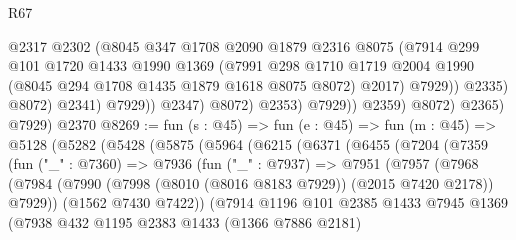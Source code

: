 \begin{lexlean}{R67}
\begin{coremodule}
                                @2317
                                @2302
                                (@8045
                                  @347
                                  @1708
                                  @2090
                                  @1879
                                  @2316
                                  @8075
                                  (@7914
                                    @299
                                    @101
                                    @1720
                                    @1433
                                    @1990
                                    @1369
                                    (@7991
                                      @298
                                      @1710
                                      @1719
                                      @2004
                                      @1990
                                      (@8045 @294 @1708 @1435 @1879 @1618 @8075 @8072)
                                      @2017)
                                    @7929))
                                @2335)
                              @8072)
                            @2341)
                          @7929))
                      @2347)
                    @8072)
                  @2353)
                @7929))
            @2359)
          @8072)
        @2365)
      @7929)
    @2370
@8269 := fun (s : @45) =>
  fun (e : @45) =>
  fun (m : @45) =>
  @5128
    (@5282
      (@5428
        (@5875
          (@5964
            (@6215
              (@6371
                (@6455
                  (@7204
                    (@7359
                      (fun ("_" : @7360) =>
                      @7936
                        (fun ("_" : @7937) =>
                        @7951
                          (@7957
                            (@7968
                              (@7984
                                (@7990
                                  (@7998 (@8010 (@8016 @8183 @7929)) (@2015 @7420 @2178))
                                  @7929))
                              (@1562 @7430 @7422))
                            (@7914
                              @1196
                              @101
                              @2385
                              @1433
                              @7945
                              @1369
                              (@7938
                                @432
                                @1195
                                @2383
                                @1433
                                (@1366 @7886 @2181)

\end{coremodule}
\end{lexlean}
